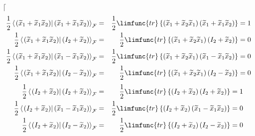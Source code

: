 \documentclass[aps,preprint]{revtex4}
\begin{document}
$\lceil $ 
\begin{eqnarray}
\frac{1}{2}\left\langle \left. \left( \widetilde{x}_{1}+\widetilde{x}_{1}%
\widetilde{x}_{2}\right) \right\vert \left( \widetilde{x}_{1}+\widetilde{x}%
_{1}\widetilde{x}_{2}\right) \right\rangle _{\mathcal{F}} &=&\frac{1}{2}%
\limfunc{tr}\left\{ \left( \widetilde{x}_{1}+\widetilde{x}_{2}\widetilde{x}%
_{1}\right) \left( \widetilde{x}_{1}+\widetilde{x}_{1}\widetilde{x}%
_{2}\right) \right\} =1 \\
\frac{1}{2}\left\langle \left. \left( \widetilde{x}_{1}+\widetilde{x}_{1}%
\widetilde{x}_{2}\right) \right\vert \left( I_{2}+\widetilde{x}_{2}\right)
\right\rangle _{\mathcal{F}} &=&\frac{1}{2}\limfunc{tr}\left\{ \left( 
\widetilde{x}_{1}+\widetilde{x}_{2}\widetilde{x}_{1}\right) \left( I_{2}+%
\widetilde{x}_{2}\right) \right\} =0 \\
\frac{1}{2}\left\langle \left. \left( \widetilde{x}_{1}+\widetilde{x}_{1}%
\widetilde{x}_{2}\right) \right\vert \left( \widetilde{x}_{1}-\widetilde{x}%
_{1}\widetilde{x}_{2}\right) \right\rangle _{\mathcal{F}} &=&\frac{1}{2}%
\limfunc{tr}\left\{ \left( \widetilde{x}_{1}+\widetilde{x}_{2}\widetilde{x}%
_{1}\right) \left( \widetilde{x}_{1}-\widetilde{x}_{1}\widetilde{x}%
_{2}\right) \right\} =0 \\
\frac{1}{2}\left\langle \left. \left( \widetilde{x}_{1}+\widetilde{x}_{1}%
\widetilde{x}_{2}\right) \right\vert \left( I_{2}-\widetilde{x}_{2}\right)
\right\rangle _{\mathcal{F}} &=&\frac{1}{2}\limfunc{tr}\left\{ \left( 
\widetilde{x}_{1}+\widetilde{x}_{2}\widetilde{x}_{1}\right) \left( I_{2}-%
\widetilde{x}_{2}\right) \right\} =0
\end{eqnarray}%
\begin{eqnarray}
\frac{1}{2}\left\langle \left. \left( I_{2}+\widetilde{x}_{2}\right)
\right\vert \left( I_{2}+\widetilde{x}_{2}\right) \right\rangle _{\mathcal{F}%
} &=&\frac{1}{2}\limfunc{tr}\left\{ \left( I_{2}+\widetilde{x}_{2}\right)
\left( I_{2}+\widetilde{x}_{2}\right) \right\} =1 \\
\frac{1}{2}\left\langle \left. \left( I_{2}+\widetilde{x}_{2}\right)
\right\vert \left( \widetilde{x}_{1}-\widetilde{x}_{1}\widetilde{x}%
_{2}\right) \right\rangle _{\mathcal{F}} &=&\frac{1}{2}\limfunc{tr}\left\{
\left( I_{2}+\widetilde{x}_{2}\right) \left( \widetilde{x}_{1}-\widetilde{x}%
_{1}\widetilde{x}_{2}\right) \right\} =0 \\
\frac{1}{2}\left\langle \left. \left( I_{2}+\widetilde{x}_{2}\right)
\right\vert \left( I_{2}-\widetilde{x}_{2}\right) \right\rangle _{\mathcal{F}%
} &=&\frac{1}{2}\limfunc{tr}\left\{ \left( I_{2}+\widetilde{x}_{2}\right)
\left( I_{2}-\widetilde{x}_{2}\right) \right\} =0
\end{eqnarray}%
\end{document}
